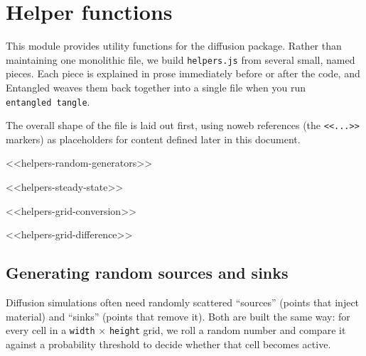 \documentclass[
  letterpaper,
  DIV=11,
  numbers=noendperiod]{scrreprt}
\newenvironment{Shaded}{\begin{snugshade}}{\end{snugshade}}
\newcommand{\NormalTok}[1]{\textcolor[rgb]{0.00,0.23,0.31}{#1}}
\newcommand{\OperatorTok}[1]{\textcolor[rgb]{0.37,0.37,0.37}{#1}}
\begin{document}

\chapter{Helper functions}\label{helper-functions}

This module provides utility functions for the diffusion package. Rather
than maintaining one monolithic file, we build \texttt{helpers.js} from
several small, named pieces. Each piece is explained in prose
immediately before or after the code, and Entangled weaves them back
together into a single file when you run \texttt{entangled\ tangle}.

The overall shape of the file is laid out first, using noweb references
(the \texttt{\textless{}\textless{}...\textgreater{}\textgreater{}}
markers) as placeholders for content defined later in this document.

\begin{Shaded}
\begin{Highlighting}[]
\OperatorTok{\textless{}\textless{}}\NormalTok{helpers}\OperatorTok{{-}}\NormalTok{random}\OperatorTok{{-}}\NormalTok{generators}\OperatorTok{\textgreater{}\textgreater{}}

\OperatorTok{\textless{}\textless{}}\NormalTok{helpers}\OperatorTok{{-}}\NormalTok{steady}\OperatorTok{{-}}\NormalTok{state}\OperatorTok{\textgreater{}\textgreater{}}

\OperatorTok{\textless{}\textless{}}\NormalTok{helpers}\OperatorTok{{-}}\NormalTok{grid}\OperatorTok{{-}}\NormalTok{conversion}\OperatorTok{\textgreater{}\textgreater{}}

\OperatorTok{\textless{}\textless{}}\NormalTok{helpers}\OperatorTok{{-}}\NormalTok{grid}\OperatorTok{{-}}\NormalTok{difference}\OperatorTok{\textgreater{}\textgreater{}}
\end{Highlighting}
\end{Shaded}

\section{Generating random sources and
sinks}\label{generating-random-sources-and-sinks}

Diffusion simulations often need randomly scattered ``sources'' (points
that inject material) and ``sinks'' (points that remove it). Both are
built the same way: for every cell in a \texttt{width} × \texttt{height}
grid, we roll a random number and compare it against a probability
threshold to decide whether that cell becomes active.
\end{document}
